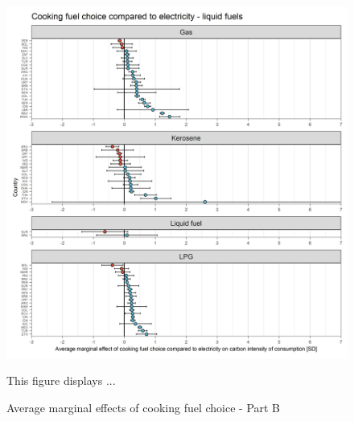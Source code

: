 \documentclass[12pt, a4paper]{article}
\newenvironment{subcaption}
{\strut
\vspace{-5pt}
\begin{minipage}[b]{0.9\textwidth}
  \hspace*{-\parindent}
  \footnotesize}
 {\end{minipage}}
\begin{document}
\begin{figure}[ht!]
  \centering
 \caption{Average marginal effects of cooking fuel choice - Part B} \label{fig:E7_Electricity_B}
  \includegraphics{Analysis_OLS_ME_Carbon_Intensity/AME_OLS_CI_CI_Electricity B}
  \begin{subcaption}
    This figure displays ...
  \end{subcaption}

\end{figure}

\clearpage
\end{document}
